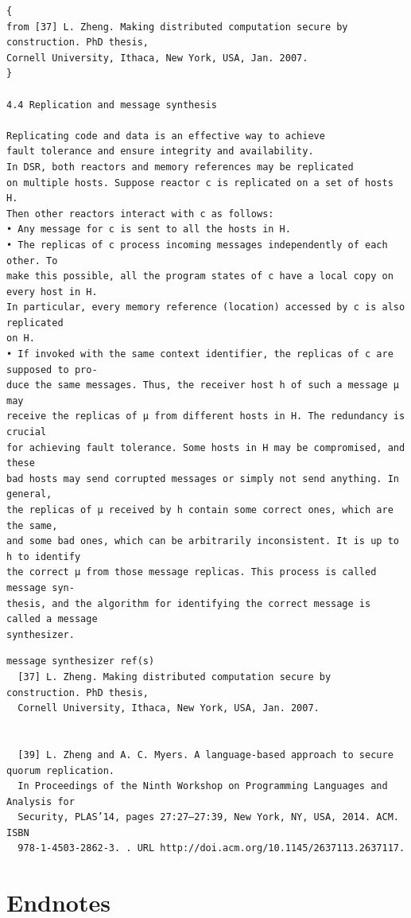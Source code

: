 \documentclass[dvipsnames]{article}
\theoremstyle{definition}
\begin{document}
\begin{verbatim}
{
from [37] L. Zheng. Making distributed computation secure by construction. PhD thesis,
Cornell University, Ithaca, New York, USA, Jan. 2007.
}

4.4 Replication and message synthesis

Replicating code and data is an effective way to achieve
fault tolerance and ensure integrity and availability.
In DSR, both reactors and memory references may be replicated
on multiple hosts. Suppose reactor c is replicated on a set of hosts H.
Then other reactors interact with c as follows:
• Any message for c is sent to all the hosts in H.
• The replicas of c process incoming messages independently of each other. To
make this possible, all the program states of c have a local copy on every host in H.
In particular, every memory reference (location) accessed by c is also replicated
on H.
• If invoked with the same context identifier, the replicas of c are supposed to pro-
duce the same messages. Thus, the receiver host h of such a message µ may
receive the replicas of µ from different hosts in H. The redundancy is crucial
for achieving fault tolerance. Some hosts in H may be compromised, and these
bad hosts may send corrupted messages or simply not send anything. In general,
the replicas of µ received by h contain some correct ones, which are the same,
and some bad ones, which can be arbitrarily inconsistent. It is up to h to identify
the correct µ from those message replicas. This process is called message syn-
thesis, and the algorithm for identifying the correct message is called a message
synthesizer.
\end{verbatim}
\begin{verbatim}
message synthesizer ref(s)
  [37] L. Zheng. Making distributed computation secure by construction. PhD thesis,
  Cornell University, Ithaca, New York, USA, Jan. 2007.


  [39] L. Zheng and A. C. Myers. A language-based approach to secure quorum replication.
  In Proceedings of the Ninth Workshop on Programming Languages and Analysis for
  Security, PLAS’14, pages 27:27–27:39, New York, NY, USA, 2014. ACM. ISBN
  978-1-4503-2862-3. . URL http://doi.acm.org/10.1145/2637113.2637117.
\end{verbatim}





\appendix

\section{Endnotes}
\printendnotes
\end{document}

